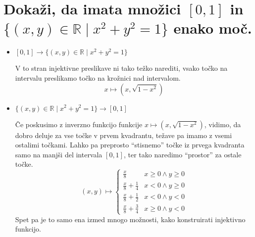 \documentclass[a4paper, 12pt]{article}
\newcommand{\RR}{\ensuremath{\mathbb{R}}}
\begin{document}
    \section{Dokaži, da imata množici $[0, 1]$ in $\{(x, y)\in\RR \mid x^2 + y^2 =1 \}$ enako moč.}
    \begin{itemize}
        \item $[0, 1] \to \{(x, y)\in\RR \mid x^2 + y^2 =1 \}$
        
        V to stran injektivne preslikave ni tako težko narediti, vsako točko na intervalu preslikamo točko na krožnici nad intervalom.
        \[
        x \mapsto (x, \sqrt{1 - x^2})
        \]
        \item $\{(x, y)\in\RR \mid x^2 + y^2 =1 \} \to [0, 1]$
        
        Če poskusimo z inverzno funkcijo funkcije $x \mapsto (x, \sqrt{1 - x^2})$, vidimo, da dobro deluje za vse točke v prvem kvadrantu, težave pa imamo z vsemi ostalimi točkami. Lahko pa preprosto ``stisnemo'' točke iz prvega kvadranta samo na manjši del intervala $[0, 1]$, ter tako naredimo ``prostor'' za ostale točke.
        \[
        (x, y) \mapsto \left\{ \begin{array}{ll}
            \frac{x}{8} & x \geq 0 \land y \geq 0 \\
            \frac{x}{8} + \frac{1}{4} & x < 0 \land y \geq 0 \\
            \frac{x}{8} + \frac{1}{2} & x < 0 \land y < 0 \\
            \frac{x}{8} + \frac{3}{4} & x \geq 0 \land y < 0
        \end{array} \right.
        \]
        Spet pa je to samo ena izmed mnogo možnosti, kako konstruirati injektivno funkcijo.
    \end{itemize}
\end{document}
